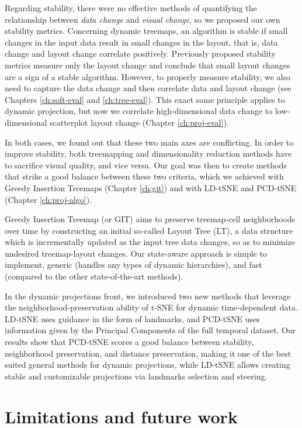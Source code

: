 Regarding stability, there were no effective methods of quantifying the relationship between \emph{data change} and \emph{visual change}, so we proposed our own stability metrics. Concerning dynamic treemaps, an algorithm is stable if small changes in the input data result in small changes in the layout, that is, data change and layout change correlate positively. Previously proposed stability metrics measure only the layout change and conclude that small layout changes are a sign of a stable algorithm. However, to properly measure stability, we also need to capture the data change and then correlate data and layout change (see Chapters \ref{ch:soft-eval} and \ref{ch:tree-eval}).
This exact same principle applies to dynamic projection, but now we correlate high-dimensional data change to low-dimensional scatterplot layout change (Chapter \ref{ch:proj-eval}).  

In both cases, we found out that these two main axes are conflicting. In order to improve stability, both treemapping and dimensionality reduction methods have to sacrifice visual quality, and vice versa.
Our goal was then to create methods that strike a good balance between these two criteria, which we achieved with Greedy Insertion Treemaps (Chapter \ref{ch:git}) and with LD-tSNE and PCD-tSNE (Chapter \ref{ch:proj-algo}).

Greedy Insertion Treemap (or GIT) aims to preserve treemap-cell neighborhoods over time by constructing an initial so-called Layout Tree (LT), a data structure which is incrementally updated as the input tree data changes, so as to minimize undesired treemap-layout changes. Our state-aware approach is simple to implement, generic (handles any types of dynamic hierarchies), and fast (compared to the other state-of-the-art methods).

In the dynamic projections front, we introduced two new methods that leverage the neighborhood-preservation ability of t-SNE for dynamic time-dependent data. LD-tSNE uses guidance in the form of landmarks, and PCD-tSNE uses information given by the Principal Components of the full temporal dataset. Our results show that PCD-tSNE scores a good balance between stability, neighborhood preservation, and distance preservation, making it one of the best suited general methods for dynamic projections, while LD-tSNE allows creating stable and customizable projections via landmarks selection and steering. 


\section{Limitations and future work}
